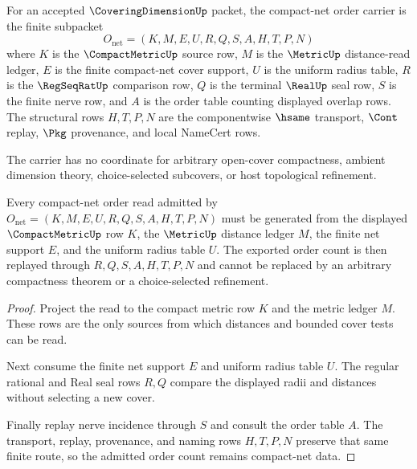 \begin{definition}
\label{def:coveringdimension-compact-net-order-carrier}
For an accepted $\CoveringDimensionUp$ packet, the compact-net order carrier is
the finite subpacket
$$
O_{\mathrm{net}}=(K,M,E,U,R,Q,S,A,H,T,P,N)
$$
where $K$ is the $\CompactMetricUp$ source row, $M$ is the $\MetricUp$
distance-read ledger, $E$ is the finite compact-net cover support, $U$ is the
uniform radius table, $R$ is the $\RegSeqRatUp$ comparison row, $Q$ is the
terminal $\RealUp$ seal row, $S$ is the finite nerve row, and $A$ is the order
table counting displayed overlap rows. The structural rows $H,T,P,N$ are the
componentwise $\hsame$ transport, $\Cont$ replay, $\Pkg$ provenance, and local
NameCert rows.

The carrier has no coordinate for arbitrary open-cover compactness, ambient
dimension theory, choice-selected subcovers, or host topological refinement.
\end{definition}

\begin{theorem}
\label{thm:coveringdimension-compact-net-order-admission}
Every compact-net order read admitted by
$O_{\mathrm{net}}=(K,M,E,U,R,Q,S,A,H,T,P,N)$ must be generated from the
displayed $\CompactMetricUp$ row $K$, the $\MetricUp$ distance ledger $M$, the
finite net support $E$, and the uniform radius table $U$. The exported order
count is then replayed through $R,Q,S,A,H,T,P,N$ and cannot be replaced by an
arbitrary compactness theorem or a choice-selected refinement.
\end{theorem}
\begin{proof}
Project the read to the compact metric row $K$ and the metric ledger $M$. These
rows are the only sources from which distances and bounded cover tests can be
read.

Next consume the finite net support $E$ and uniform radius table $U$. The
regular rational and Real seal rows $R,Q$ compare the displayed radii and
distances without selecting a new cover.

Finally replay nerve incidence through $S$ and consult the order table $A$.
The transport, replay, provenance, and naming rows $H,T,P,N$ preserve that same
finite route, so the admitted order count remains compact-net data.
\end{proof}

